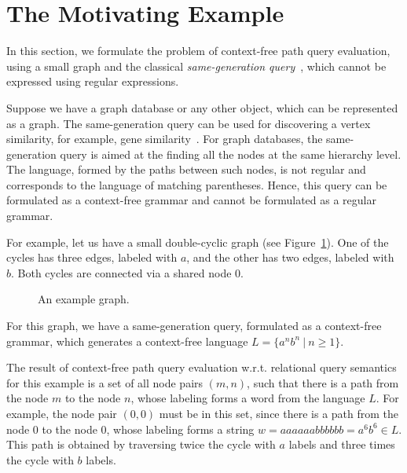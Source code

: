 \section{The Motivating Example}
\label{section_motivating}

In this section, we formulate the problem of context-free path query evaluation, using a small graph and the classical \emph{same-generation query}~\cite{FndDB}, which cannot be expressed using regular expressions.

Suppose we have a graph database or any other object, which can be represented as a graph. The same-generation query can be used for discovering a vertex similarity, for example, gene similarity~\cite{GraphQueryWithEarley}. For graph databases, the same-generation query is aimed at the finding all the nodes at the same hierarchy level. The language, formed by the paths between such nodes, is not regular and corresponds to the language of matching parentheses. Hence, this query can be formulated as a context-free grammar and cannot be formulated as a regular grammar.

For example, let us have a small double-cyclic graph (see Figure~\ref{Example_Graph}). One of the cycles has three edges, labeled with $a$, and the other has two edges, labeled with $b$. Both cycles are connected via a shared node $0$.

\begin{figure}[h]
\centering
{}
\caption{An example graph.}
\label{Example_Graph}
\end{figure}
	

For this graph, we have a same-generation query, formulated as a context-free grammar, which generates a context-free language \mbox{$L=\{a^n b^n~|~n \geq 1\}$}.

The result of context-free path query evaluation w.r.t. relational query semantics for this example is a set of all node pairs \mbox{$(m, n)$}, such that there is a path from the node $m$ to the node $n$, whose labeling forms a word from the language $L$. For example, the node pair \mbox{$(0,0)$} must be in this set, since there is a path from the node $0$ to the node $0$, whose labeling forms a string \mbox{$w = aaaaaabbbbbb = a^6b^6 \in L$}. This path is obtained by traversing twice the cycle with $a$ labels and three times the cycle with $b$ labels.